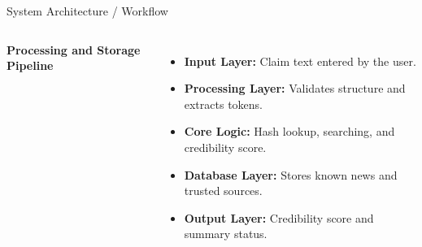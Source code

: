 \documentclass[aspectratio=169,10pt]{beamer}
\def\tightlistspacing{%
  \setlength{\itemsep}{1.2pt}%
  \setlength{\parsep}{0pt}%
  \setlength{\topsep}{1pt}%
  \setlength{\partopsep}{0pt}%
}
\begin{document}
\begin{frame}{System Architecture / Workflow}
\begin{columns}[T,totalwidth=\textwidth]
\textbf{\color{GEUBlue}\scriptsize Processing and Storage Pipeline}
\begin{itemize}\scriptsize\tightlistspacing\RaggedRight
\item \textbf{Input Layer:} Claim text entered by the user.
\item \textbf{Processing Layer:} Validates structure and extracts tokens.
\item \textbf{Core Logic:} Hash lookup, searching, and credibility score.
\item \textbf{Database Layer:} Stores known news and trusted sources.
\item \textbf{Output Layer:} Credibility score and summary status.
\end{itemize}
\end{columns}
\end{frame}
\end{document}
